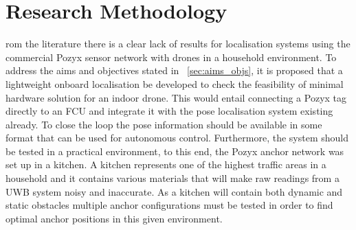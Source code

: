 \chapter{Research Methodology}\label{ch:research-methodology}
rom the literature there is a clear lack of results for localisation systems using the commercial Pozyx sensor network with drones in a household environment.
To address the aims and objectives stated in ~\ref{sec:aims_objs}, it is proposed that a lightweight onboard localisation be developed to check the feasibility of minimal hardware solution for an indoor drone.
This would entail connecting a Pozyx tag directly to an FCU and integrate it with the pose localisation system existing already.
To close the loop the pose information should be available in some format that can be used for autonomous control.
Furthermore, the system should be tested in a practical environment, to this end, the Pozyx anchor network was set up in a kitchen.
A kitchen represents one of the highest traffic areas in a household and it contains various materials that will make raw readings from a UWB system noisy and inaccurate.
As a kitchen will contain both dynamic and static obstacles multiple anchor configurations must be tested in order to find optimal anchor positions in this given environment.

